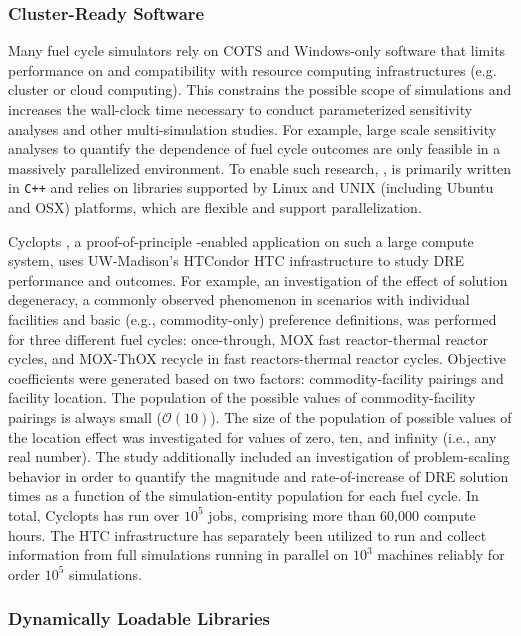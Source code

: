 \subsubsection{Cluster-Ready Software}

Many fuel cycle simulators rely on \gls{COTS} and Windows-only software that 
limits performance on and compatibility with resource computing infrastructures 
(e.g.  cluster or cloud computing). This constrains the possible scope of 
simulations and increases the wall-clock time necessary to conduct 
parameterized sensitivity analyses and other multi-simulation studies.  For 
example, large scale sensitivity analyses to quantify the dependence of fuel 
cycle outcomes are only feasible in a massively parallelized environment.  
To enable such research, \Cyclus, is primarily written in \texttt{C++} and 
relies on libraries supported by Linux and UNIX (including Ubuntu and OSX) 
platforms, which are flexible and support parallelization.

Cyclopts \cite{gidden_cyclopts_2015}, a proof-of-principle \Cyclus-enabled 
application on such a large compute system,
uses UW-Madison's HTCondor \gls{HTC} infrastructure to study \gls{DRE} performance and
outcomes. For example, an investigation of the effect of solution degeneracy, a
commonly observed phenomenon in scenarios with individual facilities and basic
(e.g., commodity-only) preference definitions, was performed for three different
fuel cycles: once-through, \gls{MOX} fast reactor-thermal reactor cycles, and
\gls{MOX}-\gls{ThOX} recycle in fast reactors-thermal reactor cycles. Objective
coefficients were generated based on two factors: commodity-facility pairings
and facility location. The population of the possible values of
commodity-facility pairings is always small ($\mathcal{O}(10)$). The size of the
population of possible values of the location effect was investigated for values
of zero, ten, and infinity (i.e., any real number). The study additionally
included an investigation of problem-scaling behavior in order to quantify the
magnitude and rate-of-increase of \gls{DRE} solution times as a function of the
simulation-entity population for each fuel
cycle\cite{gidden_agent-based_2015}. In total, Cyclopts has run over $10^5$
jobs, comprising more than 60,000 compute hours. The \gls{HTC} infrastructure
has separately been utilized to run and collect information from full \Cyclus
simulations running in parallel on $10^3$ machines reliably for order $10^5$
simulations.

\subsubsection{Dynamically Loadable Libraries}

